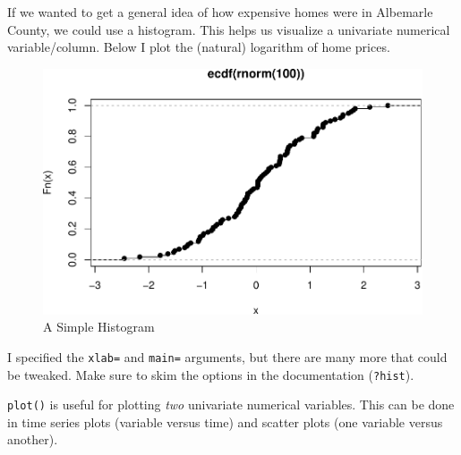 \documentclass[
  12pt,
  krantz2]{krantz}
\makeatletter
\newenvironment{Shaded}{\begin{snugshade}}{\end{snugshade}}
\newcommand{\AttributeTok}[1]{\textcolor[rgb]{0.61,0.61,0.61}{#1}}
\newcommand{\FunctionTok}[1]{\textcolor[rgb]{0,0,0}{#1}}
\newcommand{\NormalTok}[1]{#1}
\newcommand{\SpecialCharTok}[1]{\textcolor[rgb]{0,0,0}{#1}}
\newcommand{\StringTok}[1]{\textcolor[rgb]{0.5,0.5,0.5}{#1}}
\newenvironment{kframe}{%
\medskip{}
\setlength{\fboxsep}{.8em}
 \def\at@end@of@kframe{}%
 \ifinner\ifhmode%
  \def\at@end@of@kframe{\end{minipage}}%
  \begin{minipage}{\columnwidth}%
 \fi\fi%
 \def\FrameCommand##1{\hskip\@totalleftmargin \hskip-\fboxsep
 \colorbox{shadecolor}{##1}\hskip-\fboxsep
     \hskip-\linewidth \hskip-\@totalleftmargin \hskip\columnwidth}%
 \MakeFramed {\advance\hsize-\width
   \@totalleftmargin\z@ \linewidth\hsize
   \@setminipage}}%
 {\par\unskip\endMakeFramed%
 \at@end@of@kframe}
\renewenvironment{Shaded}{\begin{kframe}}{\end{kframe}}
\makeatother
\begin{document}
If we wanted to get a general idea of how expensive homes were in Albemarle County, we could use a histogram. This helps us visualize a univariate numerical variable/column. Below I plot the (natural) logarithm of home prices.

\begin{Shaded}
\end{Shaded}

\begin{figure}
\centering
\includegraphics{r_and_python_book_files/figure-latex/unnamed-chunk-217-1.pdf}
\caption{\label{fig:unnamed-chunk-217}A Simple Histogram}
\end{figure}

I specified the \texttt{xlab=} and \texttt{main=} arguments, but there are many more that could be tweaked. Make sure to skim the options in the documentation (\texttt{?hist}).

\texttt{plot()} is useful for plotting \emph{two} univariate numerical variables. This can be done in time series plots (variable versus time) and scatter plots (one variable versus another).
\end{document}
